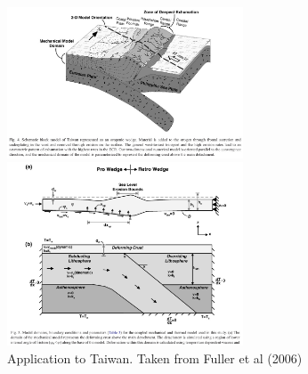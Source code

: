 \begin{center}
\includegraphics[width=7cm]{images/surfaceprocesses/fuwf06a}
\includegraphics[width=7cm]{images/surfaceprocesses/fuwf06b}\\
{\captionfont Application to Taiwan. Taken from Fuller et al (2006) \cite{fuwf06}}
\end{center}


